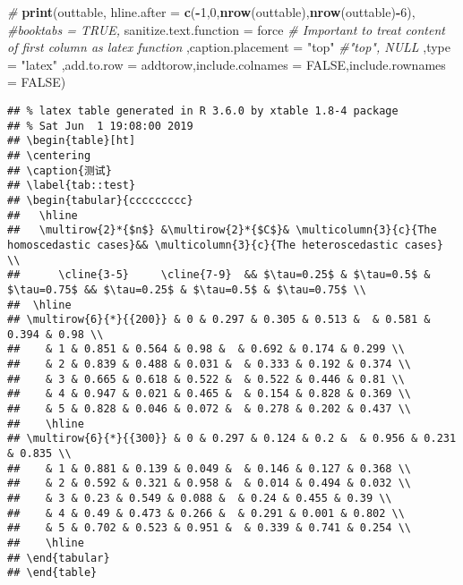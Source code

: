 \documentclass[]{ctexbook}
\newenvironment{Shaded}{\begin{snugshade}}{\end{snugshade}}
\newcommand{\CommentTok}[1]{\textcolor[rgb]{0.56,0.35,0.01}{\textit{#1}}}
\newcommand{\DataTypeTok}[1]{\textcolor[rgb]{0.13,0.29,0.53}{#1}}
\newcommand{\DecValTok}[1]{\textcolor[rgb]{0.00,0.00,0.81}{#1}}
\newcommand{\KeywordTok}[1]{\textcolor[rgb]{0.13,0.29,0.53}{\textbf{#1}}}
\newcommand{\NormalTok}[1]{#1}
\newcommand{\OperatorTok}[1]{\textcolor[rgb]{0.81,0.36,0.00}{\textbf{#1}}}
\newcommand{\OtherTok}[1]{\textcolor[rgb]{0.56,0.35,0.01}{#1}}
\newcommand{\StringTok}[1]{\textcolor[rgb]{0.31,0.60,0.02}{#1}}
\begin{document}
\begin{Shaded}
\begin{Highlighting}[]
\CommentTok{#}
\KeywordTok{print}\NormalTok{(outtable,}
          \DataTypeTok{hline.after =} \KeywordTok{c}\NormalTok{(}\OperatorTok{-}\DecValTok{1}\NormalTok{,}\DecValTok{0}\NormalTok{,}\KeywordTok{nrow}\NormalTok{(outtable),}\KeywordTok{nrow}\NormalTok{(outtable)}\OperatorTok{-}\DecValTok{6}\NormalTok{),}
          \CommentTok{#booktabs = TRUE,}
          \DataTypeTok{sanitize.text.function =}\NormalTok{ force }\CommentTok{# Important to treat content of first column as latex function}
\NormalTok{          ,}\DataTypeTok{caption.placement =} \StringTok{"top"} \CommentTok{#"top", NULL}
\NormalTok{          ,}\DataTypeTok{type =} \StringTok{"latex"}
\NormalTok{          ,}\DataTypeTok{add.to.row =}\NormalTok{ addtorow,}\DataTypeTok{include.colnames =} \OtherTok{FALSE}\NormalTok{,}\DataTypeTok{include.rownames =} \OtherTok{FALSE}\NormalTok{)}
\end{Highlighting}
\end{Shaded}

\begin{verbatim}
## % latex table generated in R 3.6.0 by xtable 1.8-4 package
## % Sat Jun  1 19:08:00 2019
## \begin{table}[ht]
## \centering
## \caption{测试} 
## \label{tab::test}
## \begin{tabular}{ccccccccc}
##   \hline
##   \multirow{2}*{$n$} &\multirow{2}*{$C$}& \multicolumn{3}{c}{The homoscedastic cases}&& \multicolumn{3}{c}{The heteroscedastic cases} \\
##      \cline{3-5}     \cline{7-9}  && $\tau=0.25$ & $\tau=0.5$ & $\tau=0.75$ && $\tau=0.25$ & $\tau=0.5$ & $\tau=0.75$ \\
##  \hline
## \multirow{6}{*}{{200}} & 0 & 0.297 & 0.305 & 0.513 &  & 0.581 & 0.394 & 0.98 \\ 
##    & 1 & 0.851 & 0.564 & 0.98 &  & 0.692 & 0.174 & 0.299 \\ 
##    & 2 & 0.839 & 0.488 & 0.031 &  & 0.333 & 0.192 & 0.374 \\ 
##    & 3 & 0.665 & 0.618 & 0.522 &  & 0.522 & 0.446 & 0.81 \\ 
##    & 4 & 0.947 & 0.021 & 0.465 &  & 0.154 & 0.828 & 0.369 \\ 
##    & 5 & 0.828 & 0.046 & 0.072 &  & 0.278 & 0.202 & 0.437 \\ 
##    \hline
## \multirow{6}{*}{{300}} & 0 & 0.297 & 0.124 & 0.2 &  & 0.956 & 0.231 & 0.835 \\ 
##    & 1 & 0.881 & 0.139 & 0.049 &  & 0.146 & 0.127 & 0.368 \\ 
##    & 2 & 0.592 & 0.321 & 0.958 &  & 0.014 & 0.494 & 0.032 \\ 
##    & 3 & 0.23 & 0.549 & 0.088 &  & 0.24 & 0.455 & 0.39 \\ 
##    & 4 & 0.49 & 0.473 & 0.266 &  & 0.291 & 0.001 & 0.802 \\ 
##    & 5 & 0.702 & 0.523 & 0.951 &  & 0.339 & 0.741 & 0.254 \\ 
##    \hline
## \end{tabular}
## \end{table}
\end{verbatim}
\end{document}

